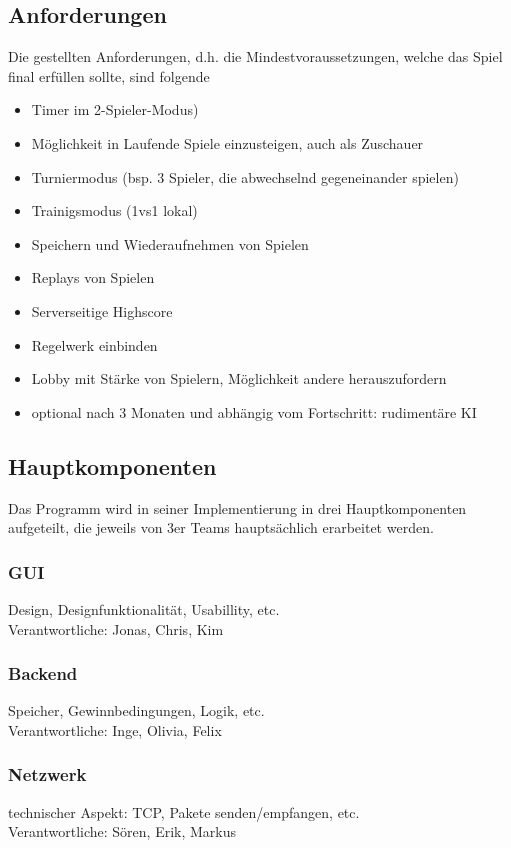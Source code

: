 \documentclass{article}
\begin{document}
\subsection*{Anforderungen}
Die gestellten Anforderungen, d.h. die Mindestvoraussetzungen, welche das Spiel final erfüllen sollte, sind folgende\\
\begin{itemize}
\item Timer im 2-Spieler-Modus)
\item Möglichkeit in Laufende Spiele einzusteigen, auch als Zuschauer
\item Turniermodus (bsp. 3 Spieler, die abwechselnd gegeneinander spielen)
\item Trainigsmodus (1vs1 lokal)
\item Speichern und Wiederaufnehmen von Spielen
\item Replays von Spielen
\item Serverseitige Highscore
\item Regelwerk einbinden
\item Lobby mit Stärke von Spielern, Möglichkeit andere herauszufordern
\item optional nach 3 Monaten und abhängig vom Fortschritt: rudimentäre KI
\end{itemize}
\subsection*{Hauptkomponenten}
Das Programm wird in seiner Implementierung in drei Hauptkomponenten aufgeteilt, die jeweils von 3er Teams hauptsächlich erarbeitet werden.
\subsubsection*{GUI}
Design, Designfunktionalität, Usabillity, etc.\\
Verantwortliche: Jonas, Chris, Kim
\subsubsection*{Backend}
Speicher, Gewinnbedingungen, Logik, etc.\\
Verantwortliche: Inge, Olivia, Felix
\subsubsection*{Netzwerk}
technischer Aspekt: TCP, Pakete senden/empfangen, etc.\\
Verantwortliche: Sören, Erik, Markus
\end{document}
